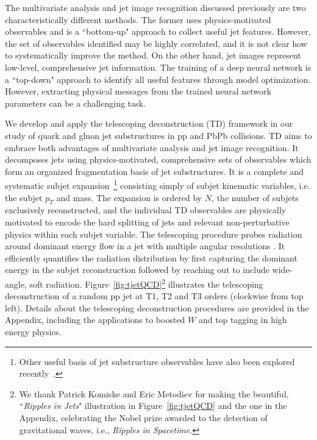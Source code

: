 \documentclass[notoc,preprintnumbers]{JHEP3}
\begin{document}
The multivariate analysis and jet image recognition discussed previously are two characteristically different methods. The former uses physics-motivated observables and is a ``bottom-up" approach to collect useful jet features. However, the set of observables identified may be highly correlated, and it is not clear how to systematically improve the method. On the other hand, jet images represent low-level, comprehensive jet information. The training of a deep neural network is a ``top-down" approach to identify all useful features through model optimization. However, extracting physical messages from the trained neural network parameters can be a challenging task.

We develop and apply the telescoping deconstruction (TD) framework in our study of quark and gluon jet substructures in pp and PbPb collisions. TD aims to embrace both advantages of multivariate analysis and jet image recognition. It decomposes jets using physics-motivated, comprehensive sets of observables which form an organized fragmentation basis of jet substructures. It is a complete and systematic subjet expansion~\footnote{Other useful basis of jet substructure observables have also been explored recently~\cite{Datta:2017rhs, Komiske:2017aww}.} consisting simply of subjet kinematic variables, i.e. the subjet $p_T$ and mass. The expansion is ordered by $N$, the number of subjets exclusively reconstructed, and the individual TD observables are physically motivated to encode the hard splitting of jets and relevant non-perturbative physics within each subjet variable. The telescoping procedure probes radiation around dominant energy flow in a jet with multiple angular resolutions \cite{Chien:2013kca,Adams:2015hiv,Chien:2014hla,Chien:2017xrb}. It efficiently quantifies the radiation distribution by first capturing the dominant energy in the subjet reconstruction followed by reaching out to include wide-angle, soft radiation. Figure~\ref{fig:tjetQCD}\footnote{We thank Patrick Komiske and Eric Metodiev for making the beautiful, ``{\sl Ripples in Jets}" illustration in Figure~\ref{fig:tjetQCD} and the one in the Appendix, celebrating the Nobel prize awarded to the detection of gravitational waves, i.e., {\sl Ripples in Spacetime}.} illustrates the telescoping deconstruction of a random pp jet at T1, T2 and T3 orders (clockwise from top left). Details about the telescoping deconstruction procedures are provided in the Appendix, including the applications to boosted $W$ and top tagging in high energy physics.
\end{document}
